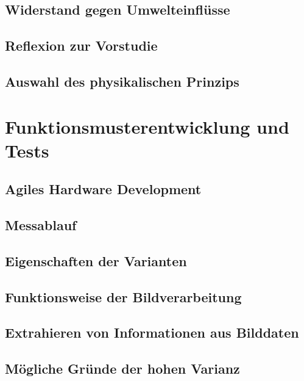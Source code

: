 \documentclass[a4paper,12pt]{article}
\begin{document}
\subsection{Widerstand gegen Umwelteinflüsse}


\subsection{Reflexion zur Vorstudie}


\subsection{Auswahl des physikalischen Prinzips}


\section{Funktionsmusterentwicklung und Tests}


\subsection{Agiles Hardware Development}


\subsection{Messablauf}


\subsection{Eigenschaften der Varianten}


\subsection{Funktionsweise der Bildverarbeitung}


\subsection{Extrahieren von Informationen aus Bilddaten}
\label{sec:DB}


\subsection{Mögliche Gründe der hohen Varianz}

\newpage
\end{document}
